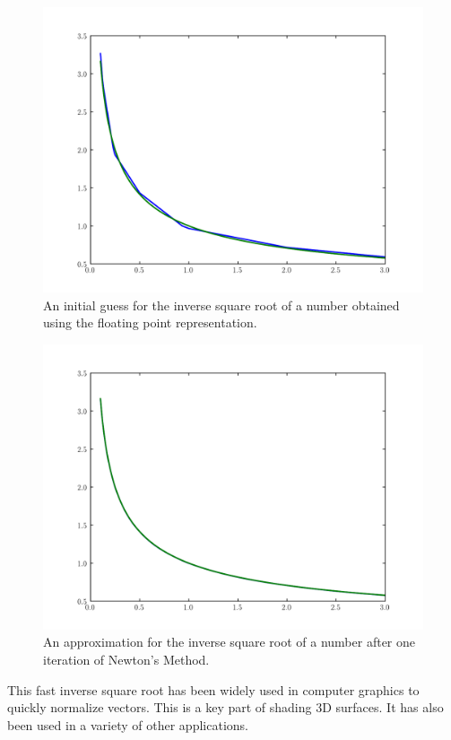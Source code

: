 

\begin{figure}
\includegraphics[width=\textwidth]{invsqrt0}
\caption{An initial guess for the inverse square root of a number obtained using the floating point representation.}
\label{float:invsqrt0}
\end{figure}

\begin{figure}
\includegraphics[width=\textwidth]{invsqrt1}
\caption{An approximation for the inverse square root of a number after one iteration of Newton's Method.}
\label{float:invsqrt1}
\end{figure}

This fast inverse square root has been widely used in computer graphics to quickly normalize vectors.
This is a key part of shading 3D surfaces.
It has also been used in a variety of other applications.

